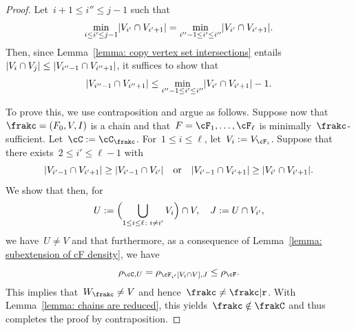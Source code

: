 \documentclass[11pt]{amsart}
\DeclarePairedDelimiter{\paren}{\lparen}{\rparen}
\DeclarePairedDelimiter{\abs}{\lvert}{\rvert}
\newcommand{\qtor}{\quad\text{or}\quad}
\newcommand{\R}{\text{\normalfont\ttfamily r}}
\theoremstyle{definition}
\numberwithin{equation}{section}
\begin{document}
	\begin{proof}
		Let~$i+1\leq i''\leq j-1$ such that
		\begin{equation*}
			\min_{i\leq i'\leq j-1} \abs{V_{i'}\cap V_{i'+1}}=\min_{i''-1\leq i'\leq i''} \abs{V_{i'}\cap V_{i'+1}}.
		\end{equation*}
		Then, since Lemma~\ref{lemma: copy vertex set intersections} entails~$\abs{V_{i}\cap V_{j}}\leq \abs{V_{i''-1}\cap V_{i''+1}}$, it suffices to show that
		\begin{equation*}
			\abs{V_{i''-1}\cap V_{i''+1}}\leq \min_{i''-1\leq i'\leq i''} \abs{V_{i'}\cap V_{i'+1}}-1.
		\end{equation*}
		
		To prove this, we use contraposition and argue as follows.
		Suppose now that~$\frakc=(F_0,V,I)$ is a chain and that~$F=\cF_1,\ldots,\cF_\ell$ is minimally~$\frakc$-sufficient.
		Let~$\cC:=\cC_{\frakc}$.
		For~$1\leq i\leq\ell$, let~$V_i:=V_{\cF_i}$.
		Suppose that there exists~$2\leq i'\leq \ell-1$ with
		\begin{equation*}
			\abs{V_{i'-1}\cap V_{i'+1}}\geq \abs{V_{i'-1}\cap V_{i'}}
			\qtor
			\abs{V_{i'-1}\cap V_{i'+1}}\geq \abs{V_{i'}\cap V_{i'+1}}.
		\end{equation*}
		We show that then, for
		\begin{equation*}
			U:=\paren[\Big]{\bigcup_{1\leq i\leq \ell\colon i\neq i'} V_i}\cap V,\quad
			J:=U\cap V_{i'},
		\end{equation*}
		we have~$U\neq V$ and that furthermore, as a consequence of Lemma~\ref{lemma: subextension of cF density}, we have
		\begin{equation*}
			\rho_{\cC,U}=\rho_{\cF_{i'}[V_i\cap V],J}\leq \rho_\cF.
		\end{equation*}
		This implies that~$W_\frakc\neq V$ and hence~$\frakc\neq\frakc|\R$.
		With Lemma~\ref{lemma: chains are reduced}, this yields~$\frakc\notin\frakC$ and thus completes the proof by contraposition.
		

\end{proof}
\end{document}
